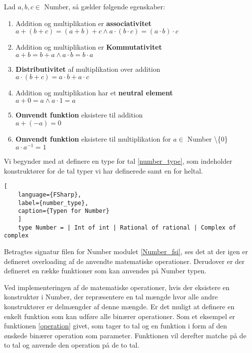 \documentclass{article}
\begin{document}
\vspace{0.5cm}
\begin{egenskab}\label{egenskab:tal}
Lad $a, b, c \in $ Number, så gælder følgende egenskaber:
\begin{enumerate}
  \item Addition og multiplikation er \textbf{associativitet} \\ $a + (b + c) = (a + b) + c \land a \cdot (b \cdot c) = (a \cdot b) \cdot c$ 
  \item Addition og multiplikation er \textbf{Kommutativitet} \\ $a + b = b + a \land a \cdot b = b \cdot a$
  \item \textbf{Distributivitet} af multiplikation over addition\\ $a \cdot (b + c) = a \cdot b + a \cdot c$
  \item Addition og multiplikation har et \textbf{neutral element} \\ $a + 0 = a \land a \cdot 1 = a$
  \item \textbf{Omvendt funktion} eksistere til addition \\ $a + (-a) = 0$
  \item \textbf{Omvendt funktion} eksistere til multiplikation for $a \in$ Number \textbackslash \{0\} \\ $a \cdot a^{-1} = 1$
\end{enumerate}
\end{egenskab}

Vi begynder med at definere en type for tal \ref{number_type}, som indeholder konstruktører for de tal typer vi har definerede samt en for heltal. 

\begin{lstlisting}[
    language={FSharp}, 
    label={number_type}, 
    caption={Typen for Number}
    ]
    type Number = | Int of int | Rational of rational | Complex of complex
\end{lstlisting}

Betragtes signatur filen for Number modulet \ref{Number_fsi}, ses det at der igen er defineret overloading af de anvendte matematiske operationer. Derudover er der defineret en række funktioner som kan anvendes på Number typen. 



Ved implementeringen af de matematiske operationer, hvis der eksistere en konstruktør i Number, der repræsentere en tal mængde hvor alle andre konstruktører er delmængder af denne mængde. Er det muligt at definere en enkelt funktion som kan udføre alle binærer operationer. Som et eksempel er funktionen \ref{operation} givet, som tager to tal og en funktion i form af den ønskede binærer operation som parameter. Funktionen vil derefter matche på de to tal og anvende den operation på de to tal. 
\end{document}
